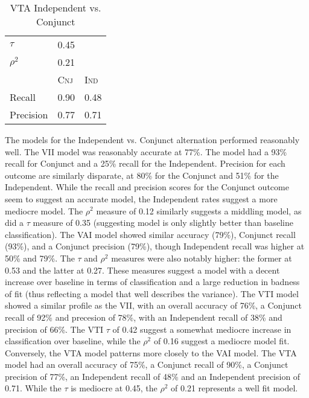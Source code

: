 \begin{table}[H]
\begin{floatrow}[2]
{\begin{tabular}{lll}
$\tau$               & 0.45               &                       \\
$\rho^{2}$           & 0.21               &                       \\
                     \midrule
                     \midrule
                     & \textsc{Cnj}     & \textsc{Ind}           \\
Recall               & 0.90               & 0.48                  \\
Precision            & 0.77               & 0.71 \\
                \bottomrule
                \end{tabular}}
    {\caption{VTA Independent vs. Conjunct}
      \label{vtaivcms}}
  \end{floatrow}
\end{table}%

The models for the Independent vs. Conjunct alternation performed reasonably well. The VII model was reasonably accurate at 77\%. The model had a 93\% recall for Conjunct and a 25\% recall for the Independent. Precision for each outcome are similarly disparate, at 80\% for the Conjunct and 51\% for the Independent. While the recall and precision scores for the Conjunct outcome seem to suggest an accurate model, the Independent rates suggest a more mediocre model. The $\rho^{2}$ measure of 0.12 similarly suggests a middling model, as did a $\tau$ measure of 0.35 (suggesting model is only slightly better than baseline classification). The VAI model showed  similar accuracy (79\%), Conjunct recall (93\%), and a Conjunct precision (79\%), though Independent recall was higher at 50\% and 79\%. The $\tau$ and $\rho^{2}$ measures were also notably higher: the former at 0.53 and the latter at 0.27. These measures suggest a model with a decent increase over baseline in terms of classification and a large reduction in badness of fit (thus reflecting a model that well describes the variance). The VTI model showed a similar profile as the VII, with an overall accuracy of 76\%, a Conjunct recall of 92\% and precesion of 78\%, with an Independent recall of 38\% and precision of 66\%. The VTI $\tau$ of 0.42 suggest a somewhat mediocre increase in classification over baseline, while the $\rho^{2}$ of 0.16 suggest a mediocre model fit. Conversely, the VTA model patterns more closely to the VAI model. The VTA model had an overall accuracy of 75\%, a Conjunct recall of 90\%, a Conjunct precision of 77\%, an Independent recall of 48\% and an Independent precision of 0.71. While the $\tau$ is mediocre at 0.45, the $\rho^{2}$  of 0.21 represents a well fit model.


